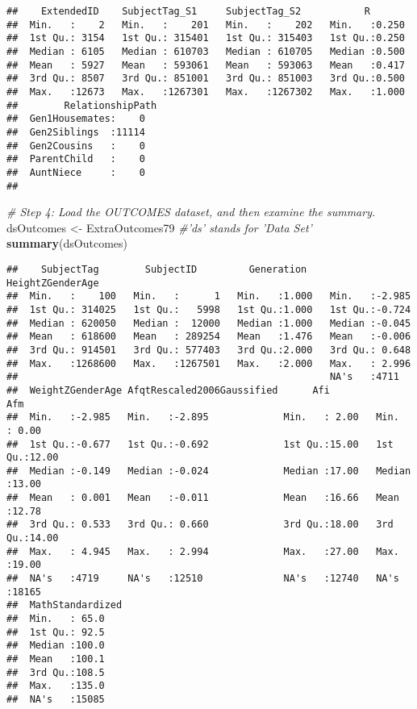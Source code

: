 \documentclass[smallextended]{svjour3}       %
\newenvironment{Shaded}{\begin{snugshade}}{\end{snugshade}}
\newcommand{\CommentTok}[1]{\textcolor[rgb]{0.56,0.35,0.01}{\textit{#1}}}
\newcommand{\KeywordTok}[1]{\textcolor[rgb]{0.13,0.29,0.53}{\textbf{#1}}}
\newcommand{\NormalTok}[1]{#1}
\newcommand{\StringTok}[1]{\textcolor[rgb]{0.31,0.60,0.02}{#1}}
\begin{document}
\begin{verbatim}
##    ExtendedID    SubjectTag_S1     SubjectTag_S2           R        
##  Min.   :    2   Min.   :    201   Min.   :    202   Min.   :0.250  
##  1st Qu.: 3154   1st Qu.: 315401   1st Qu.: 315403   1st Qu.:0.250  
##  Median : 6105   Median : 610703   Median : 610705   Median :0.500  
##  Mean   : 5927   Mean   : 593061   Mean   : 593063   Mean   :0.417  
##  3rd Qu.: 8507   3rd Qu.: 851001   3rd Qu.: 851003   3rd Qu.:0.500  
##  Max.   :12673   Max.   :1267301   Max.   :1267302   Max.   :1.000  
##        RelationshipPath
##  Gen1Housemates:    0  
##  Gen2Siblings  :11114  
##  Gen2Cousins   :    0  
##  ParentChild   :    0  
##  AuntNiece     :    0  
## 
\end{verbatim}

\begin{Shaded}
\begin{Highlighting}[]
\CommentTok{# Step 4: Load the OUTCOMES dataset, and then examine the summary.}
\NormalTok{dsOutcomes <-}\StringTok{ }\NormalTok{ExtraOutcomes79 }\CommentTok{#'ds' stands for 'Data Set'}
\KeywordTok{summary}\NormalTok{(dsOutcomes)}
\end{Highlighting}
\end{Shaded}

\begin{verbatim}
##    SubjectTag        SubjectID         Generation    HeightZGenderAge
##  Min.   :    100   Min.   :      1   Min.   :1.000   Min.   :-2.985  
##  1st Qu.: 314025   1st Qu.:   5998   1st Qu.:1.000   1st Qu.:-0.724  
##  Median : 620050   Median :  12000   Median :1.000   Median :-0.045  
##  Mean   : 618600   Mean   : 289254   Mean   :1.476   Mean   :-0.006  
##  3rd Qu.: 914501   3rd Qu.: 577403   3rd Qu.:2.000   3rd Qu.: 0.648  
##  Max.   :1268600   Max.   :1267501   Max.   :2.000   Max.   : 2.996  
##                                                      NA's   :4711    
##  WeightZGenderAge AfqtRescaled2006Gaussified      Afi             Afm       
##  Min.   :-2.985   Min.   :-2.895             Min.   : 2.00   Min.   : 0.00  
##  1st Qu.:-0.677   1st Qu.:-0.692             1st Qu.:15.00   1st Qu.:12.00  
##  Median :-0.149   Median :-0.024             Median :17.00   Median :13.00  
##  Mean   : 0.001   Mean   :-0.011             Mean   :16.66   Mean   :12.78  
##  3rd Qu.: 0.533   3rd Qu.: 0.660             3rd Qu.:18.00   3rd Qu.:14.00  
##  Max.   : 4.945   Max.   : 2.994             Max.   :27.00   Max.   :19.00  
##  NA's   :4719     NA's   :12510              NA's   :12740   NA's   :18165  
##  MathStandardized
##  Min.   : 65.0   
##  1st Qu.: 92.5   
##  Median :100.0   
##  Mean   :100.1   
##  3rd Qu.:108.5   
##  Max.   :135.0   
##  NA's   :15085
\end{verbatim}
\end{document}
